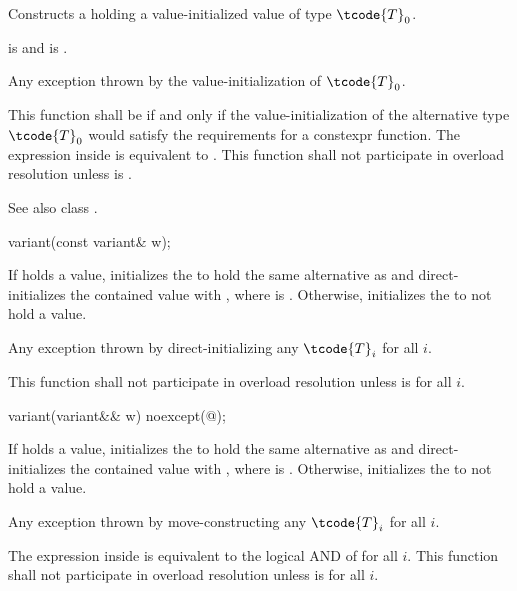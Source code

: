 \begin{itemdescr}
\pnum
\effects
Constructs a  holding a value-initialized value of type $\tcode{T}_0$.

\pnum
\postconditions
{} is  and  is .

\pnum
\throws
Any exception thrown by the value-initialization of $\tcode{T}_0$.

\pnum
\remarks
This function shall be  if and only if the
value-initialization of the alternative type $\tcode{T}_0$ would satisfy the
requirements for a constexpr function.
The expression inside  is equivalent to
.
This function shall not participate in overload resolution unless
 is .
\begin{note} See also class . \end{note}
\end{itemdescr}

%
\begin{itemdecl}
variant(const variant& w);
\end{itemdecl}

\begin{itemdescr}
\pnum
\effects
If  holds a value, initializes the  to hold the same
alternative as  and direct-initializes the contained value
with , where  is .
Otherwise, initializes the  to not hold a value.

\pnum
\throws
Any exception thrown by direct-initializing any $\tcode{T}_i$ for all $i$.

\pnum
\remarks
This function shall not participate in overload resolution unless
 is  for all $i$.
\end{itemdescr}

%
\begin{itemdecl}
variant(variant&& w) noexcept(@\seebelow@);
\end{itemdecl}

\begin{itemdescr}
\pnum
\effects
If  holds a value, initializes the  to hold the same
alternative as  and direct-initializes the contained value with
, where  is .
Otherwise, initializes the  to not hold a value.

\pnum
\throws
Any exception thrown by move-constructing any $\tcode{T}_i$ for all $i$.

\pnum
\remarks
The expression inside  is equivalent to the logical AND of
 for all $i$.
This function shall not participate in overload resolution unless
 is  for all $i$.
\end{itemdescr}

